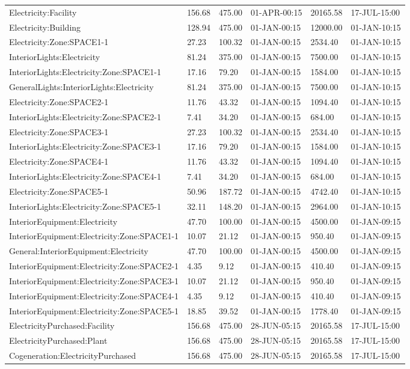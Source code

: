 {\begin{longtable}[c]{>{\raggedright}p{1.5in}>{\raggedright}p{0.9in}>{\raggedright}p{0.9in}>{\raggedright}p{0.9in}>{\raggedright}p{0.9in}>{\raggedright}p{0.9in}}
Electricity\-:Facility & 156.68 & 475.00 & 01-APR-00:15 & 20165.58 & 17-JUL-15:00 \tabularnewline
Electricity\-:Building & 128.94 & 475.00 & 01-JAN-00:15 & 12000.00 & 01-JAN-10:15 \tabularnewline
Electricity\-:Zone:SPACE1-1 & 27.23 & 100.32 & 01-JAN-00:15 & 2534.40 & 01-JAN-10:15 \tabularnewline
InteriorLights\-:Electricity & 81.24 & 375.00 & 01-JAN-00:15 & 7500.00 & 01-JAN-10:15 \tabularnewline
InteriorLights\-:Electricity\-:Zone\-:SPACE1-1 & 17.16 & 79.20 & 01-JAN-00:15 & 1584.00 & 01-JAN-10:15 \tabularnewline
GeneralLights\-:InteriorLights\-:Electricity & 81.24 & 375.00 & 01-JAN-00:15 & 7500.00 & 01-JAN-10:15 \tabularnewline
Electricity\-:Zone\-:SPACE2-1 & 11.76 & 43.32 & 01-JAN-00:15 & 1094.40 & 01-JAN-10:15 \tabularnewline
InteriorLights\-:Electricity\-:Zone\-:SPACE2-1 & 7.41 & 34.20 & 01-JAN-00:15 & 684.00 & 01-JAN-10:15 \tabularnewline
Electricity\-:Zone\-:SPACE3-1 & 27.23 & 100.32 & 01-JAN-00:15 & 2534.40 & 01-JAN-10:15 \tabularnewline
InteriorLights\-:Electricity\-:Zone\-:SPACE3-1 & 17.16 & 79.20 & 01-JAN-00:15 & 1584.00 & 01-JAN-10:15 \tabularnewline
Electricity\-:Zone\-:SPACE4-1 & 11.76 & 43.32 & 01-JAN-00:15 & 1094.40 & 01-JAN-10:15 \tabularnewline
InteriorLights\-:Electricity\-:Zone\-:SPACE4-1 & 7.41 & 34.20 & 01-JAN-00:15 & 684.00 & 01-JAN-10:15 \tabularnewline
Electricity\-:Zone\-:SPACE5-1 & 50.96 & 187.72 & 01-JAN-00:15 & 4742.40 & 01-JAN-10:15 \tabularnewline
InteriorLights\-:Electricity\-:Zone\-:SPACE5-1 & 32.11 & 148.20 & 01-JAN-00:15 & 2964.00 & 01-JAN-10:15 \tabularnewline
InteriorEquipment\-:Electricity & 47.70 & 100.00 & 01-JAN-00:15 & 4500.00 & 01-JAN-09:15 \tabularnewline
InteriorEquipment\-:Electricity\-:Zone\-:SPACE1-1 & 10.07 & 21.12 & 01-JAN-00:15 & 950.40 & 01-JAN-09:15 \tabularnewline
General\-:InteriorEquipment\-:Electricity & 47.70 & 100.00 & 01-JAN-00:15 & 4500.00 & 01-JAN-09:15 \tabularnewline
InteriorEquipment\-:Electricity\-:Zone\-:SPACE2-1 & 4.35 & 9.12 & 01-JAN-00:15 & 410.40 & 01-JAN-09:15 \tabularnewline
InteriorEquipment\-:Electricity\-:Zone\-:SPACE3-1 & 10.07 & 21.12 & 01-JAN-00:15 & 950.40 & 01-JAN-09:15 \tabularnewline
InteriorEquipment\-:Electricity\-:Zone\-:SPACE4-1 & 4.35 & 9.12 & 01-JAN-00:15 & 410.40 & 01-JAN-09:15 \tabularnewline
InteriorEquipment\-:Electricity\-:Zone\-:SPACE5-1 & 18.85 & 39.52 & 01-JAN-00:15 & 1778.40 & 01-JAN-09:15 \tabularnewline
ElectricityPurchased\-:Facility & 156.68 & 475.00 & 28-JUN-05:15 & 20165.58 & 17-JUL-15:00 \tabularnewline
ElectricityPurchased\-:Plant & 156.68 & 475.00 & 28-JUN-05:15 & 20165.58 & 17-JUL-15:00 \tabularnewline
Cogeneration\-:ElectricityPurchased & 156.68 & 475.00 & 28-JUN-05\-:15 & 20165.58 & 17-JUL-15\-:00 \tabularnewline

\end{longtable}}
